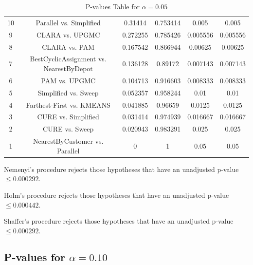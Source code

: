 \documentclass[a4paper,10pt]{article}
\begin{document}
\begin{landscape}
\begin{table}[!htp]
\begin{tabular}{cccccc}
10&Parallel vs. Simplified&0.31414&0.753414&0.005&0.005\\
9&CLARA vs. UPGMC&0.272255&0.785426&0.005556&0.005556\\
8&CLARA vs. PAM&0.167542&0.866944&0.00625&0.00625\\
7&BestCyclicAssignment vs. NearestByDepot&0.136128&0.89172&0.007143&0.007143\\
6&PAM vs. UPGMC&0.104713&0.916603&0.008333&0.008333\\
5&Simplified vs. Sweep&0.052357&0.958244&0.01&0.01\\
4&Farthest-First vs. KMEANS&0.041885&0.96659&0.0125&0.0125\\
3&CURE vs. Simplified&0.031414&0.974939&0.016667&0.016667\\
2&CURE vs. Sweep&0.020943&0.983291&0.025&0.025\\
1&NearestByCustomer vs. Parallel&0&1&0.05&0.05\\
\hline
\end{tabular}
\caption{P-values Table for $\alpha=0.05$}
\end{table}Nemenyi's procedure rejects those hypotheses that have an unadjusted p-value $\le0.000292$.

Holm's procedure rejects those hypotheses that have an unadjusted p-value $\le0.000442$.

Shaffer's procedure rejects those hypotheses that have an unadjusted p-value $\le0.000292$.

\pagebreak

\subsection{P-values for $\alpha=0.10$}


\end{landscape}
\end{document}

